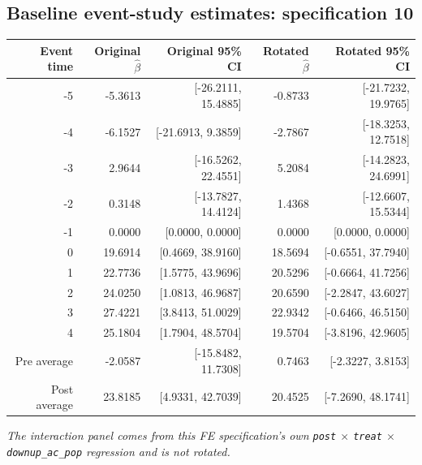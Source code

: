 \documentclass[10pt]{article}
\begin{document}
\subsection*{Baseline event-study estimates: specification 10}
\begin{center}
\scriptsize
\begin{tabular}{r rr rr}
\toprule
Event time & Original $\hat\beta$ & Original 95\% CI & Rotated $\hat\beta$ & Rotated 95\% CI \\
\midrule
-5 & -5.3613 & [-26.2111, 15.4885] & -0.8733 & [-21.7232, 19.9765] \\
-4 & -6.1527 & [-21.6913, 9.3859] & -2.7867 & [-18.3253, 12.7518] \\
-3 & 2.9644 & [-16.5262, 22.4551] & 5.2084 & [-14.2823, 24.6991] \\
-2 & 0.3148 & [-13.7827, 14.4124] & 1.4368 & [-12.6607, 15.5344] \\
-1 & 0.0000 & [0.0000, 0.0000] & 0.0000 & [0.0000, 0.0000] \\
0 & 19.6914 & [0.4669, 38.9160] & 18.5694 & [-0.6551, 37.7940] \\
1 & 22.7736 & [1.5775, 43.9696] & 20.5296 & [-0.6664, 41.7256] \\
2 & 24.0250 & [1.0813, 46.9687] & 20.6590 & [-2.2847, 43.6027] \\
3 & 27.4221 & [3.8413, 51.0029] & 22.9342 & [-0.6466, 46.5150] \\
4 & 25.1804 & [1.7904, 48.5704] & 19.5704 & [-3.8196, 42.9605] \\
\midrule
Pre average & -2.0587 & [-15.8482, 11.7308] & 0.7463 & [-2.3227, 3.8153] \\
Post average & 23.8185 & [4.9331, 42.7039] & 20.4525 & [-7.2690, 48.1741] \\
\bottomrule
\end{tabular}
\end{center}
\medskip
\textit{The interaction panel comes from this FE specification's own \texttt{post} $\times$ \texttt{treat} $\times$ \texttt{downup\_ac\_pop} regression and is not rotated.}
\clearpage
\end{document}
